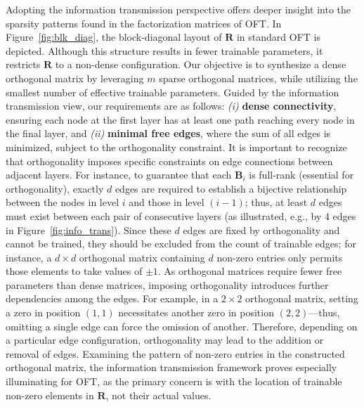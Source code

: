 Adopting the information transmission perspective offers deeper insight into the sparsity patterns found in the factorization matrices of OFT. In Figure~\ref{fig:blk_diag}, the block-diagonal layout of $\bm{R}$ in standard OFT is depicted. Although this structure results in fewer trainable parameters, it restricts $\bm{R}$ to a non-dense configuration. Our objective is to synthesize a dense orthogonal matrix by leveraging $m$ sparse orthogonal matrices, while utilizing the smallest number of effective trainable parameters. Guided by the information transmission view, our requirements are as follows: \emph{(i)} \textbf{dense connectivity}, ensuring each node at the first layer has at least one path reaching every node in the final layer, and \emph{(ii)} \textbf{minimal free edges}, where the sum of all edges is minimized, subject to the orthogonality constraint. It is important to recognize that orthogonality imposes specific constraints on edge connections between adjacent layers. For instance, to guarantee that each $\bm{B}_i$ is full-rank (essential for orthogonality), exactly $d$ edges are required to establish a bijective relationship between the nodes in level $i$ and those in level $(i-1)$; thus, at least $d$ edges must exist between each pair of consecutive layers (as illustrated, e.g., by 4 edges in Figure~\ref{fig:info_trans}). Since these $d$ edges are fixed by orthogonality and cannot be trained, they should be excluded from the count of trainable edges; for instance, a $d \times d$ orthogonal matrix containing $d$ non-zero entries only permits those elements to take values of $\pm 1$. As orthogonal matrices require fewer free parameters than dense matrices, imposing orthogonality introduces further dependencies among the edges. For example, in a $2 \times 2$ orthogonal matrix, setting a zero in position $(1,1)$ necessitates another zero in position $(2,2)$—thus, omitting a single edge can force the omission of another. Therefore, depending on a particular edge configuration, orthogonality may lead to the addition or removal of edges. Examining the pattern of non-zero entries in the constructed orthogonal matrix, the information transmission framework proves especially illuminating for OFT, as the primary concern is with the location of trainable non-zero elements in $\bm{R}$, not their actual values.

